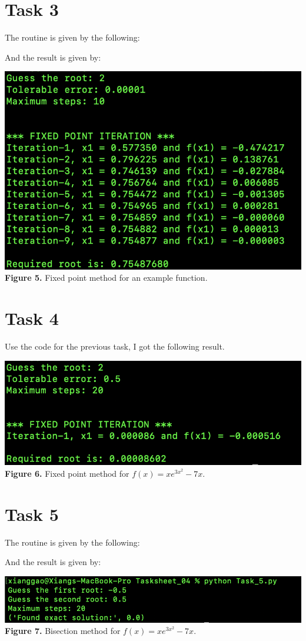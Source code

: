 \documentclass{article}
\begin{document}
\section*{Task 3}
The routine is given by the following:

And the result is given by:
\begin{center}
\includegraphics[scale = 1]{Screenshots/fixedPoints.png}\\
{\bf Figure 5.} Fixed point method for an example function.
\end{center}

\section*{Task 4}
Use the code for the previous task, I got the following result.
\begin{center}
\includegraphics[scale = 0.8]{Screenshots/Task4.png}\\
{\bf Figure 6.} Fixed point method for $f(x) = xe^{3x^2} - 7x$.
\end{center}

\section*{Task 5}
The routine is given by the following:

And the result is given by:
\begin{center}
\includegraphics[width=\textwidth]{Screenshots/5.png}\\
{\bf Figure 7.} Bisection method for $f(x) = xe^{3x^2} - 7x$.
\end{center}
\end{document}
